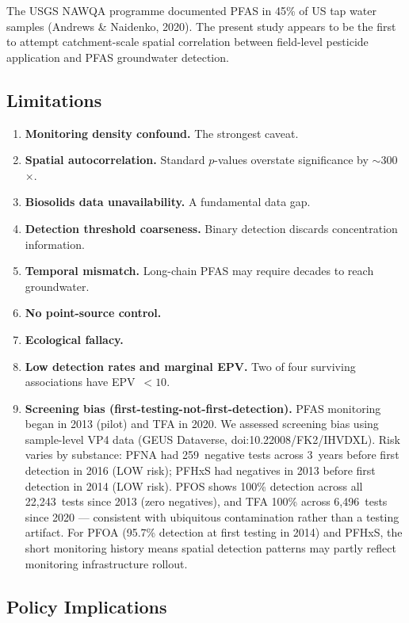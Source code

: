 \documentclass[12pt,a4paper]{article}
\begin{document}
The USGS NAWQA programme documented PFAS in 45\% of US tap water samples (Andrews \& Naidenko, 2020). The present study appears to be the first to attempt catchment-scale spatial correlation between field-level pesticide application and PFAS groundwater detection.

\subsection{Limitations}

\begin{enumerate}
\item \textbf{Monitoring density confound.} The strongest caveat.
\item \textbf{Spatial autocorrelation.} Standard $p$-values overstate significance by $\sim$300$\times$.
\item \textbf{Biosolids data unavailability.} A fundamental data gap.
\item \textbf{Detection threshold coarseness.} Binary detection discards concentration information.
\item \textbf{Temporal mismatch.} Long-chain PFAS may require decades to reach groundwater.
\item \textbf{No point-source control.}
\item \textbf{Ecological fallacy.}
\item \textbf{Low detection rates and marginal EPV.} Two of four surviving associations have EPV~$< 10$.

\item \textbf{Screening bias (first-testing-not-first-detection).} PFAS monitoring began in 2013 (pilot) and TFA in 2020. We assessed screening bias using sample-level VP4 data (GEUS Dataverse, doi:10.22008/FK2/IHVDXL). Risk varies by substance: PFNA had 259~negative tests across 3~years before first detection in 2016 (LOW risk); PFHxS had negatives in 2013 before first detection in 2014 (LOW risk). PFOS shows 100\% detection across all 22,243~tests since 2013 (zero negatives), and TFA 100\% across 6,496~tests since 2020 --- consistent with ubiquitous contamination rather than a testing artifact. For PFOA (95.7\% detection at first testing in 2014) and PFHxS, the short monitoring history means spatial detection patterns may partly reflect monitoring infrastructure rollout.
\end{enumerate}

\subsection{Policy Implications}
\end{document}
